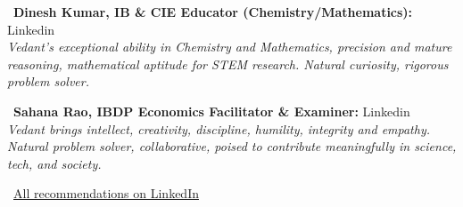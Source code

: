 \documentclass[a4paper,10pt]{article}
\begin{document}
\faQuoteLeft~\textbf{Dinesh Kumar, IB \& CIE Educator (Chemistry/Mathematics):} Linkedin \href{https://www.linkedin.com/in/vedantpatnaik/details/recommendations/#:~:text=Dinesh%20Kumar,Academy%0Adineshk%40knowledgeumacademy.in}{\faExternalLink}\\
\emph{Vedant's exceptional ability in Chemistry and Mathematics, precision and mature reasoning, mathematical aptitude for STEM research. Natural curiosity, rigorous problem solver.}

\faQuoteLeft~\textbf{Sahana Rao, IBDP Economics Facilitator \& Examiner:} Linkedin \href{https://www.linkedin.com/in/vedantpatnaik/details/recommendations/#:~:text=Sahana%20Rao,as%20a%20whole.}{\faExternalLink}\\
\emph{Vedant brings intellect, creativity, discipline, humility, integrity and empathy. Natural problem solver, collaborative, poised to contribute meaningfully in science, tech, and society.}

\faExternalLink~\href{https://www.linkedin.com/in/vedantpatnaik/details/recommendations/}{All recommendations on LinkedIn}

\end{document}
